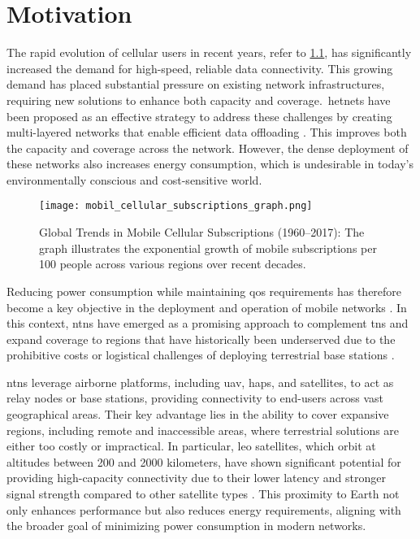 \chapter{Motivation}\label{ch:motivation}

The rapid evolution of cellular users in recent years, refer to \cref{fig:cellular_subscriptions}, has significantly increased the demand for high-speed, reliable data connectivity. This growing demand has placed substantial pressure on existing network infrastructures, requiring new solutions to enhance both capacity and coverage.\ \glspl{hetnet} have been proposed as an effective strategy to address these challenges by creating multi-layered networks that enable efficient data offloading \autocite{xu2021survey}. This improves both the capacity and coverage across the network. However, the dense deployment of these networks also increases energy consumption, which is undesirable in today's environmentally conscious and cost-sensitive world.

\begin{figure}
  \texttt{[image: mobil\_cellular\_subscriptions\_graph.png]}
  \caption{Global Trends in Mobile Cellular Subscriptions (1960–2017): The graph illustrates the exponential growth of mobile subscriptions per 100 people across various regions over recent decades. \autocite{pahoInformationSystems}}\label{fig:cellular_subscriptions}
\end{figure}

Reducing power consumption while maintaining \gls{qos} requirements has therefore become a key objective in the deployment and operation of mobile networks \autocite{lopezperez2022survey}. In this context, \glspl{ntn} have emerged as a promising approach to complement \glspl{tn} and expand coverage to regions that have historically been underserved due to the prohibitive costs or logistical challenges of deploying terrestrial base stations \autocite{ahmmed2022digital}.

\glspl{ntn} leverage airborne platforms, including \gls{uav}, \glspl{hap}, and satellites, to act as relay nodes or base stations, providing connectivity to end-users across vast geographical areas. Their key advantage lies in the ability to cover expansive regions, including remote and inaccessible areas, where terrestrial solutions are either too costly or impractical. In particular, \gls{leo} satellites, which orbit at altitudes between 200 and 2000 kilometers, have shown significant potential for providing high-capacity connectivity due to their lower latency and stronger signal strength compared to other satellite types \autocite{giordani2021non}. This proximity to Earth not only enhances performance but also reduces energy requirements, aligning with the broader goal of minimizing power consumption in modern networks.

